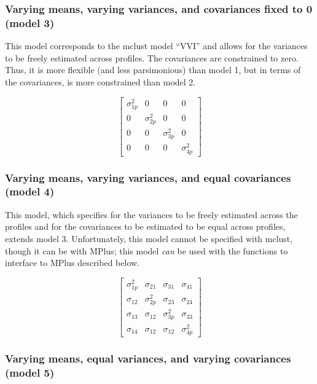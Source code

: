 \documentclass[]{msu-thesis}
\theoremstyle{definition}
\theoremstyle{definition}
\theoremstyle{definition}
\theoremstyle{remark}
\begin{document}
\subsubsection{Varying means, varying variances, and covariances fixed
to 0 (model
3)}\label{varying-means-varying-variances-and-covariances-fixed-to-0-model-3}

This model corresponds to the mclust model ``VVI'' and allows for the
variances to be freely estimated across profiles. The covariances are
constrained to zero. Thus, it is more flexible (and less parsimonious)
than model 1, but in terms of the covariances, is more constrained than
model 2.

\[ 
\left[ \begin{matrix} { \sigma  }_{ 1p }^{ 2 } & 0 & 0 & 0 \\ 0 & { \sigma  }_{ 2p }^{ 2 } & 0 & 0 \\ 0 & 0 & { \sigma  }_{ 3p }^{ 2 } & 0 \\ 0 & 0 & 0 & { \sigma  }_{ 4p }^{ 2 } \end{matrix} \right] 
\]

\subsubsection{Varying means, varying variances, and equal covariances
(model
4)}\label{varying-means-varying-variances-and-equal-covariances-model-4}

This model, which specifies for the variances to be freely estimated
across the profiles and for the covariances to be estimated to be equal
across profiles, extends model 3. Unfortunately, this model cannot be
specified with mclust, though it can be with MPlus; this model
\emph{can} be used with the functions to interface to MPlus described
below.

\[
\left[ \begin{matrix} { \sigma  }_{ 1p }^{ 2 } & { \sigma  }_{ 21 } & { \sigma  }_{ 31 } & { \sigma  }_{ 41 } \\ { \sigma  }_{ 12 } & { \sigma  }_{ 2p }^{ 2 } & { \sigma  }_{ 23 } & { \sigma  }_{ 24 } \\ { \sigma  }_{ 13 } & { \sigma  }_{ 12 } & { \sigma  }_{ 3p }^{ 2 } & { \sigma  }_{ 33 } \\ { \sigma  }_{ 14 } & { \sigma  }_{ 12 } & { \sigma  }_{ 12 } & { \sigma  }_{ 4p }^{ 2 } \end{matrix} \right] 
\]

\subsubsection{Varying means, equal variances, and varying covariances
(model
5)}\label{varying-means-equal-variances-and-varying-covariances-model-5}
\end{document}
